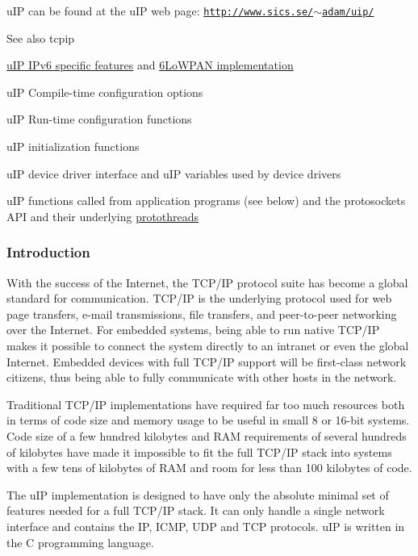 u\+IP can be found at the u\+IP web page\+: \href{http://www.sics.se/~adam/uip/}{\tt http\+://www.\+sics.\+se/$\sim$adam/uip/}

\begin{DoxySeeAlso}{See also}
tcpip 

\hyperlink{a00075}{u\+IP I\+Pv6 specific features} and \hyperlink{a00070}{6\+Lo\+W\+P\+A\+N implementation} 

u\+IP Compile-\/time configuration options 

u\+IP Run-\/time configuration functions 

u\+IP initialization functions 

u\+IP device driver interface and u\+IP variables used by device drivers 

u\+IP functions called from application programs (see below) and the protosockets A\+PI and their underlying \hyperlink{a00066}{protothreads}
\end{DoxySeeAlso}
\hypertarget{a00074_uIPIntroduction}{}\subsubsection{Introduction}\label{a00074_uIPIntroduction}
With the success of the Internet, the T\+C\+P/\+IP protocol suite has become a global standard for communication. T\+C\+P/\+IP is the underlying protocol used for web page transfers, e-\/mail transmissions, file transfers, and peer-\/to-\/peer networking over the Internet. For embedded systems, being able to run native T\+C\+P/\+IP makes it possible to connect the system directly to an intranet or even the global Internet. Embedded devices with full T\+C\+P/\+IP support will be first-\/class network citizens, thus being able to fully communicate with other hosts in the network.

Traditional T\+C\+P/\+IP implementations have required far too much resources both in terms of code size and memory usage to be useful in small 8 or 16-\/bit systems. Code size of a few hundred kilobytes and R\+AM requirements of several hundreds of kilobytes have made it impossible to fit the full T\+C\+P/\+IP stack into systems with a few tens of kilobytes of R\+AM and room for less than 100 kilobytes of code.

The u\+IP implementation is designed to have only the absolute minimal set of features needed for a full T\+C\+P/\+IP stack. It can only handle a single network interface and contains the IP, I\+C\+MP, U\+DP and T\+CP protocols. u\+IP is written in the C programming language.

